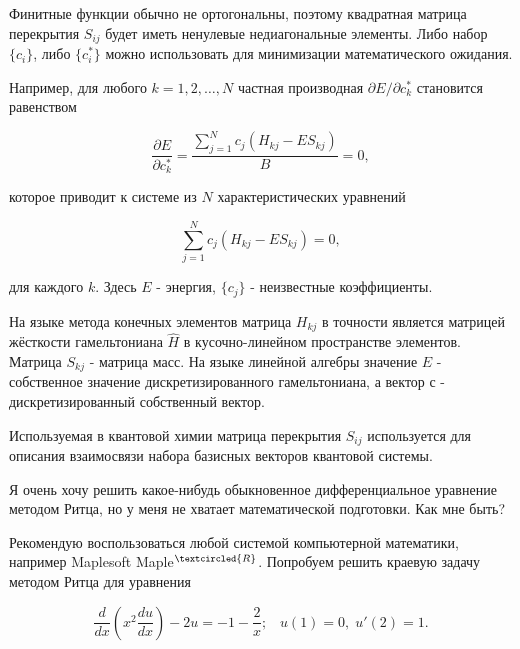 \documentclass{article}
\begin{document}
Финитные функции обычно не ортогональны, поэтому квадратная матрица перекрытия $S_{ij}$ будет иметь ненулевые недиагональные элементы. Либо набор $\{ c_{i} \}$, либо $\{ c_{i}^{*} \}$ можно использовать для минимизации математического ожидания.

Например, для любого $k = 1, 2, \dots, N$ частная производная $\partial E / \partial c_{k}^{*}$ становится равенством

\begin{displaymath}
	\frac{\partial E}{\partial c_{k}^{*}} = \frac{\sum_{j=1}^{N} c_{j} (H_{kj} - E S_{kj})}{B}= 0,
\end{displaymath}

\noindent которое приводит к системе из $N$ характеристических уравнений

\begin{displaymath}
	\sum_{j=1}^{N} c_{j} (H_{kj} - E S_{kj}) = 0,
\end{displaymath}

\noindent для каждого $k$. Здесь $E$ - энергия, $\{ c_{j} \}$ - неизвестные коэффициенты.

На языке метода конечных элементов матрица $H_{kj}$ в точности является матрицей жёсткости гамельтониана $\hat{H}$ в кусочно-линейном пространстве элементов.
Матрица $S_{kj}$ - матрица масс. На языке линейной алгебры значение $E$ - собственное значение дискретизированного гамельтониана, а вектор $с$ - дискретизированный собственный вектор.

\begin{info} %
	Используемая в квантовой химии матрица перекрытия $S_{ij}$ используется для описания взаимосвязи набора базисных векторов квантовой системы.
\end{info}

\newpage
\begin{question}
	Я очень хочу решить какое-нибудь обыкновенное дифференциальное уравнение методом Ритца, но у меня не хватает математической подготовки. Как мне быть?
\end{question}

Рекомендую воспользоваться любой системой компьютерной математики, например Maplesoft Maple$^{\textcircled{ \scriptsize R \normalsize} }$. Попробуем решить краевую задачу методом Ритца для уравнения

\begin{displaymath}
	\frac{d}{dx} \left( x^{2} \frac{du}{dx} \right) - 2u = -1 - \frac{2}{x}; \; \; \; u(1) = 0, \; u'(2) = 1.
\end{displaymath}
\end{document}
